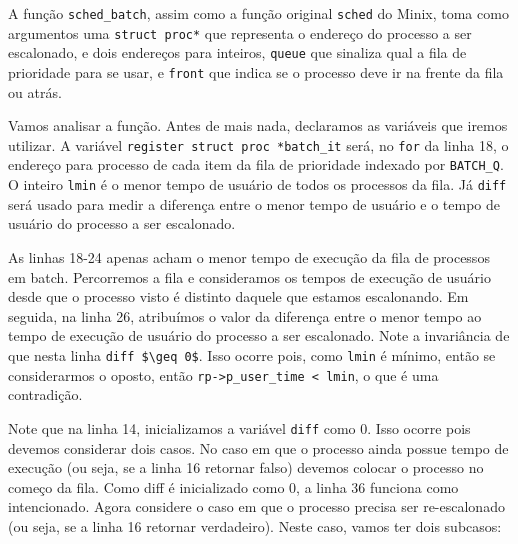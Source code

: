 \documentclass{amsart}
\theoremstyle{plain}
\newcommand{\code}[1]{\lstinline[mathescape=true]{#1}}
\newcommand{\mcode}[1]{\lstinline[mathescape]!#1!}
\begin{document}
A função \code{sched_batch}, assim como a função original \code{sched} do Minix, toma como
argumentos uma \code{struct proc*} que representa o endereço do processo a ser escalonado, e dois
endereços para inteiros, \code{queue} que sinaliza qual a fila de prioridade para se usar, e
\code{front} que indica se o processo deve ir na frente da fila ou atrás.

Vamos analisar a função. Antes de mais nada, declaramos as variáveis que iremos utilizar. A
variável \code{register struct proc *batch_it} será, no \code{for} da linha 18, o endereço para
processo de cada item da fila de prioridade indexado por \code{BATCH_Q}. O inteiro \code{lmin}
é o menor tempo de usuário de todos os processos da fila. Já \code{diff} será usado para medir a
diferença entre o menor tempo de usuário e o tempo de usuário do processo a ser escalonado.

As linhas 18-24 apenas acham o menor tempo de execução da fila de processos em batch. Percorremos
a fila e consideramos os tempos de execução de usuário desde que o processo visto é distinto
daquele que estamos escalonando. Em seguida, na linha 26, atribuímos o valor da diferença entre o
menor tempo ao tempo de execução de usuário do processo a ser escalonado. Note a invariância de que
nesta linha \mcode{diff $\geq 0$}. Isso ocorre pois, como \code{lmin} é mínimo, então se
considerarmos o oposto, então \code{rp->p_user_time < lmin}, o que é uma contradição.

Note que na linha 14, inicializamos a variável \code{diff} como 0. Isso ocorre pois devemos
considerar dois casos. No caso em que o processo ainda possue tempo de execução (ou seja, se a
linha 16 retornar falso) devemos colocar o processo no começo da fila. Como diff é inicializado
como 0, a linha 36 funciona como intencionado. Agora considere o caso em que o processo precisa ser
re-escalonado (ou seja, se a linha 16 retornar verdadeiro). Neste caso, vamos ter dois subcasos:
\end{document}
